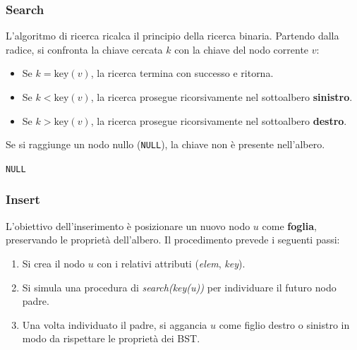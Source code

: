 \subsubsection{Search}
L'algoritmo di ricerca ricalca il principio della ricerca binaria. Partendo dalla radice, si confronta la chiave cercata $k$ con la chiave del nodo corrente $v$:
\begin{itemize}
    \item Se $k = \text{key}(v)$, la ricerca termina con successo e ritorna.
    \item Se $k < \text{key}(v)$, la ricerca prosegue ricorsivamente nel sottoalbero \textbf{sinistro}.
    \item Se $k > \text{key}(v)$, la ricerca prosegue ricorsivamente nel sottoalbero \textbf{destro}.
\end{itemize}
Se si raggiunge un nodo nullo (\texttt{NULL}), la chiave non è presente nell'albero.

\begin{algorithm}[H]
    \caption{Ricerca in un BST}
    \label{alg:search_bst}
    \SetAlgoLined
    \DontPrintSemicolon
    
    
    \BlankLine 
    
    \Return \texttt{NULL}\;
\end{algorithm}

\subsubsection{Insert}
L'obiettivo dell'inserimento è posizionare un nuovo nodo $u$ come \textbf{foglia}, preservando le proprietà dell'albero. Il procedimento prevede i seguenti passi:
\begin{enumerate}
    \item Si crea il nodo $u$ con i relativi attributi (\textit{elem}, \textit{key}).
    \item Si simula una procedura di \textit{search(key(u))} per individuare il futuro nodo padre.
    \item Una volta individuato il padre, si aggancia $u$ come figlio destro o sinistro in modo da rispettare le proprietà dei BST.
\end{enumerate}

